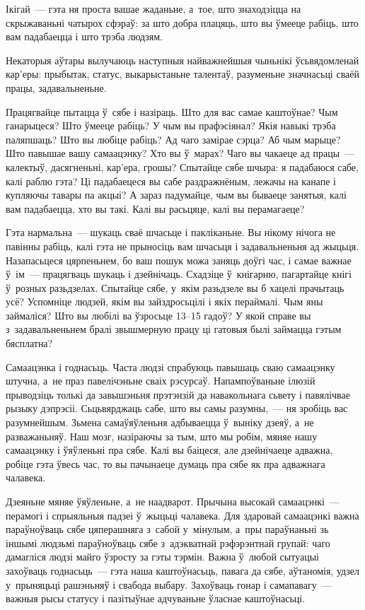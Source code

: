 Ікігай~--- гэта ня проста вашае жаданьне, а~тое, што знаходзіцца на скрыжаваньні чатырох сфэраў: за што добра плацяць, што вы ўмееце рабіць, што вам падабаецца і што трэба людзям.

Некаторыя аўтары вылучаюць наступныя найважнейшыя чыньнікі ўсьвядомленай кар'еры: прыбытак, статус, выкарыстаньне талентаў, разуменьне значнасьці сваёй працы, задавальненьне.

Працягвайце пытацца ў~сябе і назіраць. Што для вас самае каштоўнае? Чым ганарыцеся? Што ўмееце рабіць? У чым вы прафэсіянал? Якія навыкі трэба паляпшаць? Што вы любіце рабіць? Ад чаго замірае сэрца? Аб чым марыце? Што павышае вашу самаацэнку? Хто вы ў~марах? Чаго вы чакаеце ад працы~--- калектыў, дасягненьні, кар'ера, грошы? Спытайце сябе шчыра: я падабаюся сабе, калі раблю гэта? Ці падабаецеся вы сабе раздражнёным, лежачы на канапе і купляючы тавары па акцыі? А зараз падумайце, чым вы бываеце занятыя, калі вам падабаецца, хто вы такі. Калі вы расьцяце, калі вы перамагаеце?

Гэта нармальна~--- шукаць сваё шчасьце і пакліканьне. Вы нікому нічога не павінны рабіць, калі гэта не прыносіць вам шчасьця і задавальненьня ад жыцьця. Назапасьцеся цярпеньнем, бо ваш пошук можа заняць доўгі час, і самае важнае ў~ім~--- працягваць шукаць і дзейнічаць. Схадзіце ў~кнігарню, пагартайце кнігі ў~розных разьдзелах. Спытайце сябе, у~якім разьдзеле вы б хацелі прачытаць усё? Успомніце людзей, якім вы зайздросьцілі і якіх пераймалі. Чым яны займаліся? Што вы любілі ва ўзросьце 13--15 гадоў? У якой справе вы з~задавальненьнем бралі звышмерную працу ці гатовыя былі займацца гэтым бясплатна?

Самаацэнка і годнасьць. Часта людзі спрабуюць павышаць сваю самаацэнку штучна, а~не праз павелічэньне сваіх рэсурсаў. Напампоўваньне ілюзій прыводзіць толькі да завышэньня прэтэнзій да навакольнага сьвету і павялічвае рызыку дэпрэсіі. Сьцьвярджаць сабе, што вы самы разумны,~--- ня зробіць вас разумнейшым. Зьмена самаўяўленьня адбываецца ў~выніку дзеяў, а~не разважаньняў. Наш мозг, назіраючы за тым, што мы робім, мяняе нашу самаацэнку і ўяўленьні пра сябе. Калі вы баіцеся, але дзейнічаеце адважна, робіце гэта ўвесь час, то вы пачынаеце думаць пра сябе як пра адважнага чалавека.

Дзеяньне мяняе ўяўленьне, а~не наадварот. Прычына высокай самаацэнкі~--- перамогі і спрыяльныя падзеі ў~жыцьці чалавека. Для здаровай самаацэнкі важна параўноўваць сябе цяперашняга з~сабой у~мінулым, а~пры параўнаньні зь іншымі людзьмі параўноўваць сябе з~адэкватнай рэфэрэнтнай групай: чаго дамагліся людзі майго ўзросту за гэты тэрмін. Важна ў~любой сытуацыі захоўваць годнасьць~--- гэта наша каштоўнасьць, павага да сябе, аўтаномія, удзел у~прыняцьці рашэньняў і свабода выбару. Захоўваць гонар і самапавагу~--- важныя рысы статусу і пазітыўнае адчуваньне ўласнае каштоўнасьці.

